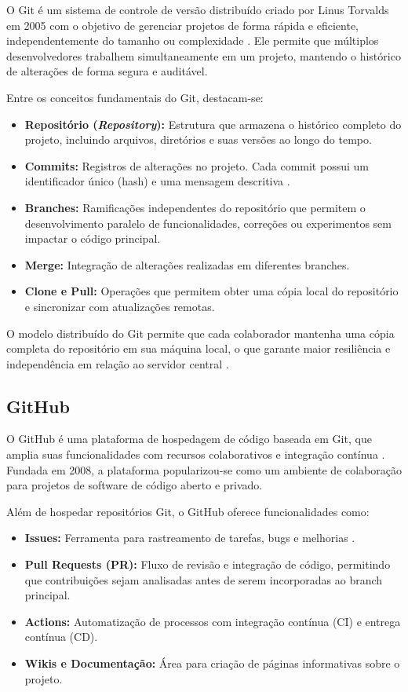 O Git é um sistema de controle de versão distribuído criado por Linus Torvalds em 2005 com o objetivo de gerenciar projetos de forma rápida e eficiente, independentemente do tamanho ou complexidade \cite{chacon_git}. Ele permite que múltiplos desenvolvedores trabalhem simultaneamente em um projeto, mantendo o histórico de alterações de forma segura e auditável.

Entre os conceitos fundamentais do Git, destacam-se:

\begin{itemize}
\item \textbf{Repositório (\textit{Repository}):} Estrutura que armazena o histórico completo do projeto, incluindo arquivos, diretórios e suas versões ao longo do tempo.
\item \textbf{Commits:} Registros de alterações no projeto. Cada commit possui um identificador único (hash) e uma mensagem descritiva \cite{chacon_git}.
\item \textbf{Branches:} Ramificações independentes do repositório que permitem o desenvolvimento paralelo de funcionalidades, correções ou experimentos sem impactar o código principal.
\item \textbf{Merge:} Integração de alterações realizadas em diferentes branches.
\item \textbf{Clone e Pull:} Operações que permitem obter uma cópia local do repositório e sincronizar com atualizações remotas.
\end{itemize}

O modelo distribuído do Git permite que cada colaborador mantenha uma cópia completa do repositório em sua máquina local, o que garante maior resiliência e independência em relação ao servidor central \cite{chacon_git}.

\subsection{GitHub}
\label{subsec:github}

O GitHub é uma plataforma de hospedagem de código baseada em Git, que amplia suas funcionalidades com recursos colaborativos e integração contínua \cite{github_official}. Fundada em 2008, a plataforma popularizou-se como um ambiente de colaboração para projetos de software de código aberto e privado.

Além de hospedar repositórios Git, o GitHub oferece funcionalidades como:

\begin{itemize}
\item \textbf{Issues:} Ferramenta para rastreamento de tarefas, bugs e melhorias \cite{github_official}.
\item \textbf{Pull Requests (PR):} Fluxo de revisão e integração de código, permitindo que contribuições sejam analisadas antes de serem incorporadas ao branch principal.
\item \textbf{Actions:} Automatização de processos com integração contínua (CI) e entrega contínua (CD).
\item \textbf{Wikis e Documentação:} Área para criação de páginas informativas sobre o projeto.
\end{itemize}


